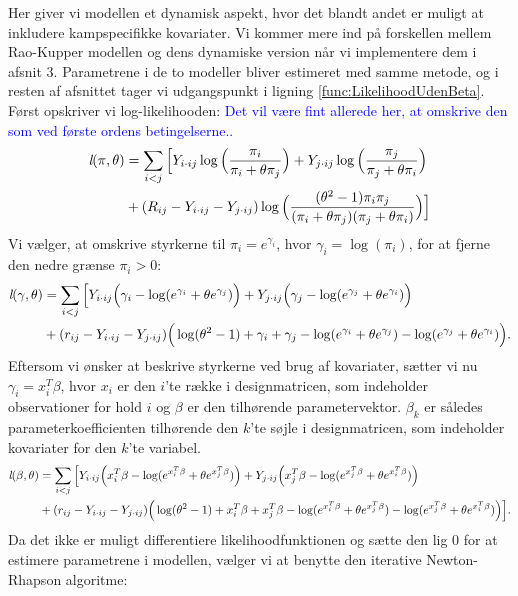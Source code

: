 \documentclass[11pt,a4paper]{article}
\begin{document}
Her giver vi modellen et dynamisk aspekt, hvor det blandt andet er muligt at inkludere kampspecifikke kovariater. Vi kommer mere ind på forskellen mellem Rao-Kupper modellen og dens dynamiske version når vi implementere dem i afsnit 3. Parametrene i de to modeller bliver estimeret med samme metode, og i resten af afsnittet tager vi udgangspunkt i ligning \ref{func:LikelihoodUdenBeta}.
Først opskriver vi log-likelihooden: 
\textcolor{blue}{Det vil være fint allerede her, at omskrive den som ved første ordens betingelserne..}
\begin{align*}
\textit{l}(\pi,\theta)
&=\sum_{i<j}\Big{[}Y_{i\cdot ij}\log\Big{(}\frac{\pi_i}{\pi_i+\theta\pi_j}\Big{)}
+ Y_{j\cdot ij}\log\Big{(}\frac{\pi_j}{\pi_j+\theta\pi_i}\Big{)}\\
&+ (R_{ij}-Y_{i\cdot ij}-Y_{j\cdot ij}) \log\Big{(}\frac{(\theta^2-1)\pi_i \pi_j}{(\pi_i+\theta\pi_j)(\pi_j+\theta\pi_i)}\Big{)}\Big{]}
\end{align*}
Vi vælger, at omskrive styrkerne til $\pi_i=e^{\gamma_i}$, hvor $\gamma_i=\log(\pi_i)$, for at fjerne den nedre grænse $\pi_i>0$: \\
\begin{align*}
\textit{l}(\gamma,\theta)
&=\sum_{i<j}\Big{[}Y_{i\cdot ij}\Big{(}\gamma_i-\log(e^{\gamma_i}+\theta e^{\gamma_j})\Big{)}
+Y_{j\cdot ij}\Big{(}\gamma_j-\log(e^{\gamma_j}+\theta e^{\gamma_i})\Big{)}\\
& +(r_{ij}-Y_{i\cdot ij}-Y_{j\cdot ij}) \Big{(} \log(\theta^2-1)+\gamma_i+\gamma_j-\log(e^{\gamma_i}+\theta e^{\gamma_j})-\log(e^{\gamma_j}+\theta e^{\gamma_i})\Big{)}.
\end{align*}
Eftersom vi ønsker at beskrive styrkerne ved brug af kovariater, sætter vi nu $\gamma_i=x_i^T\beta$, hvor $x_i$ er den $i$'te række i designmatricen, som indeholder observationer for hold $i$ og $\beta$ er den tilhørende parametervektor. $\beta_k$ er således parameterkoefficienten tilhørende den $k$'te søjle i designmatricen, som indeholder kovariater for den $k$'te variabel.\\
\begin{align*}
\textit{l}(\beta,\theta)
&=\sum_{i<j}\Big{[}Y_{i\cdot ij}\Big{(}x_i^T\beta-\log(e^{x_i^T\beta}+\theta e^{x_j^T\beta})\Big{)}
+Y_{j\cdot ij}\Big{(}x_j^T\beta-\log(e^{x_j^T\beta}+\theta e^{x_i^T\beta})\Big{)}\\
& +(r_{ij}-Y_{i\cdot ij}-Y_{j\cdot ij}) \Big{(} \log(\theta^2-1)+x_i^T\beta+x_j^T\beta-\log(e^{x_i^T\beta}+\theta e^{x_j^T\beta})-\log(e^{x_j^T\beta}+\theta e^{x_i^T\beta})\Big{)}\Big{]}.
\end{align*}
Da det ikke er muligt differentiere likelihoodfunktionen og sætte den lig 0 for at estimere parametrene i modellen, vælger vi at benytte den iterative Newton-Rhapson algoritme:
\end{document}
